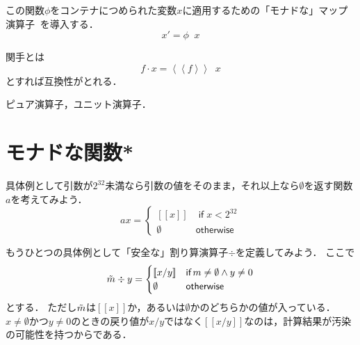 \documentclass[a5paper,draft]{jsbook}
\def\[{\left[\!\left[}
\def\]{\right]\!\right]}
\newcommand{\mathMaybeVar}[1]{\Tilde{#1}}
\newcommand{\mathMaybeWith}[1]{\[#1\]}
\newcommand{\mathUnitWith}[1]{\left\langle\!\left\langle#1\right\rangle\!\right\rangle}
\newcommand{\mathNothing}{\emptyset}
\newcommand{\mathAnd}{\mathbin{\wedge}}
\newcommand{\mathGeneralMap}{\mathbin{\cdot}}
\newcommand{\mathKeyword}[1]{\operatorname{\textsf{#1}}}
\newcommand{\mathIf}{\mathKeyword{if}}
\newcommand{\mathOtherwise}{\mathKeyword{otherwise}}
\DeclareMathOperator{\hsklMonadMap}{{DO NOT USE}--\heartsuit}
\begin{document}
この関数$\phi$をコンテナにつめられた変数$x$に適用するための「モナドな」マップ演算子$\hsklMonadMap$を導入する．
$$x'=\phi\hsklMonadMap x$$

関手とは
$$f\mathGeneralMap x=\mathUnitWith{f}\hsklMonadMap x$$
とすれば互換性がとれる．


ピュア演算子，ユニット演算子．


\section{モナドな関数*}


具体例として引数が$2^{32}$未満なら引数の値をそのまま，それ以上なら$\mathNothing$を返す関数$a$を考えてみよう．
\begin{equation}
ax=\begin{cases}
\mathMaybeWith{x}&\mathIf x<2^{32}\\
\mathNothing&\mathOtherwise
\end{cases}
\end{equation}


もうひとつの具体例として「安全な」割り算演算子$\div$を定義してみよう．
ここで
\begin{equation}
\mathMaybeVar{m}\div y=\begin{cases}\mathMaybeWith{x/y}&\mathIf m\neq\mathNothing\mathAnd y\neq0\\
\mathNothing&\mathOtherwise\end{cases}
\end{equation}
とする．
ただし$\mathMaybeVar{m}$は$\mathMaybeWith{x}$か，あるいは$\mathNothing$かのどちらかの値が入っている．
$x\neq\mathNothing$かつ$y\neq0$のときの戻り値が$x/y$ではなく$\mathMaybeWith{x/y}$なのは，計算結果が汚染の可能性を持つからである．
\end{document}

